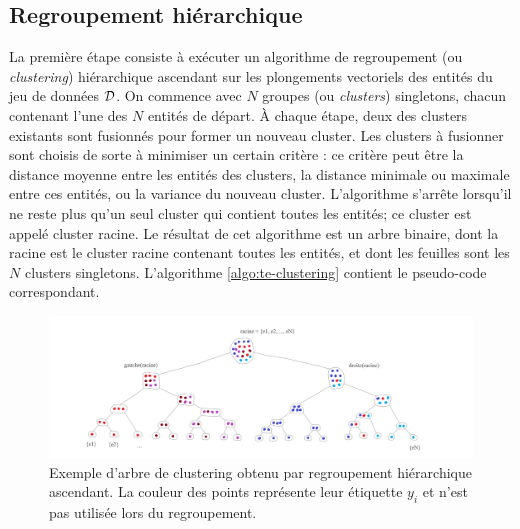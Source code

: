 

\subsection{Regroupement hiérarchique}
\label{subsec:te-clustering}

La première étape consiste à exécuter un algorithme de regroupement (ou \textit{clustering}) hiérarchique ascendant sur les plongements vectoriels des entités du jeu de données $\cal{D}$. %
On commence avec $N$ groupes (ou \textit{clusters}) singletons, chacun contenant l'une des $N$ entités de départ. À chaque étape, deux des clusters existants sont fusionnés pour former un nouveau cluster. Les clusters à fusionner sont choisis de sorte à minimiser un certain critère : ce critère peut être la distance moyenne entre les entités des clusters, la distance minimale ou maximale entre ces entités, ou la variance du nouveau cluster. 
L'algorithme s'arrête lorsqu'il ne reste plus qu'un seul cluster qui contient toutes les entités; ce cluster est appelé cluster racine. Le résultat de cet algorithme est un arbre binaire, dont la racine est le cluster racine contenant toutes les entités, et dont les feuilles sont les $N$ clusters singletons. L'algorithme \ref{algo:te-clustering} contient le pseudo-code correspondant.

\begin{figure}[h]
    \centering
    \includegraphics[width=\textwidth]{img/clustering_tree.png}
    \caption[Principe du regroupement hiérarchique ascendant]{Exemple d'arbre de clustering obtenu par regroupement hiérarchique ascendant. La couleur des points représente leur étiquette $y_i$ et n'est pas utilisée lors du regroupement.}
    \label{fig:clustering_tree}
\end{figure}

